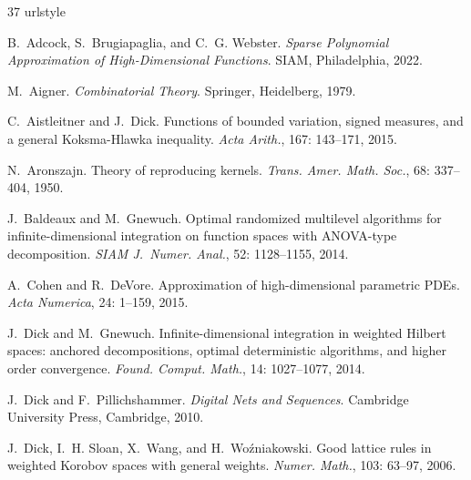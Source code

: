 \documentclass{article}
\theoremstyle{plain}
\theoremstyle{definition}
\begin{document}
\begin{thebibliography}{37}
\providecommand{\natexlab}[1]{#1}
\providecommand{\url}[1]{\texttt{#1}}
\expandafter\ifx\csname urlstyle\endcsname\relax
  \providecommand{\doi}[1]{doi: #1}\else
  \providecommand{\doi}{doi: \begingroup \urlstyle{rm}\Url}\fi

B.~Adcock, S.~Brugiapaglia, and C.~G. Webster.
\newblock \emph{Sparse Polynomial Approximation of High-Dimensional Functions}.
\newblock SIAM, Philadelphia, 2022.

M.~Aigner.
\newblock \emph{Combinatorial Theory}.
\newblock Springer, Heidelberg, 1979.

C.~Aistleitner and J.~Dick.
\newblock Functions of bounded variation, signed measures, and a general
  {K}oksma-{H}lawka inequality.
\newblock \emph{Acta Arith.}, 167: 143--171, 2015.

N.~Aronszajn.
\newblock Theory of reproducing kernels.
\newblock \emph{Trans. Amer. Math. Soc.}, 68: 337--404, 1950.

J.~Baldeaux and M.~Gnewuch.
\newblock Optimal randomized multilevel algorithms for infinite-dimensional
  integration on function spaces with {ANOVA}-type decomposition.
\newblock \emph{SIAM J.~Numer. Anal.}, 52: 1128--1155, 2014.

A.~Cohen and R.~DeVore.
\newblock Approximation of high-dimensional parametric {PDE}s.
\newblock \emph{Acta Numerica}, 24: 1--159, 2015.

J.~Dick and M.~Gnewuch.
\newblock Infinite-dimensional integration in weighted {H}ilbert spaces:
  anchored decompositions, optimal deterministic algorithms, and higher order
  convergence.
\newblock \emph{Found. Comput. Math.}, 14: 1027--1077, 2014.

J.~Dick and F.~Pillichshammer.
\newblock \emph{Digital Nets and Sequences}.
\newblock Cambridge University Press, Cambridge, 2010.

J.~Dick, I.~H. Sloan, X.~Wang, and H.~Wo{\'z}niakowski.
\newblock Good lattice rules in weighted {K}orobov spaces with general weights.
\newblock \emph{Numer. Math.}, 103: 63--97, 2006.


\end{thebibliography}
\end{document}

